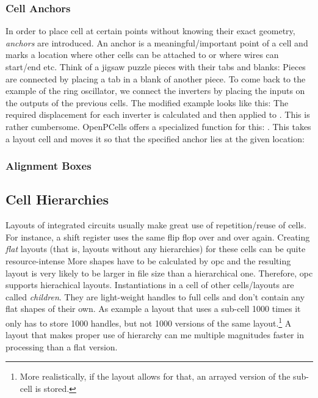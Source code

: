 \subsubsection{Cell Anchors}
In order to place cell at certain points without knowing their exact geometry, \emph{anchors} are introduced.
An anchor is a meaningful/important point of a cell and marks a location where other cells can be attached to or where wires can start/end etc.
Think of a jigsaw puzzle pieces with their tabs and blanks: Pieces are connected by placing a tab in a blank of another piece.
To come back to the example of the ring oscillator, we connect the inverters by placing the inputs on the outputs of the previous cells.
The modified example looks like this:
The required displacement for each inverter is calculated and then applied to .
This is rather cumbersome.
OpenPCells offers a specialized function for this: .
This takes a layout cell and moves it so that the specified anchor lies at the given location:

\subsubsection{Alignment Boxes}

\subsection{Cell Hierarchies}\label{sec:hierarchies}
Layouts of integrated circuits usually make great use of repetition/reuse of cells.
For instance, a shift register uses the same flip flop over and over again.
Creating \emph{flat} layouts (that is, layouts without any hierarchies) for these cells can be quite resource-intense
More shapes have to be calculated by opc and the resulting layout is very likely to be larger in file size than a hierarchical one.
Therefore, opc supports hierachical layouts.
Instantiations in a cell of other cells/layouts are called \emph{children}.
They are light-weight handles to full cells and don't contain any flat shapes of their own.
As example a layout that uses a sub-cell 1000 times it only has to store 1000 handles, but not 1000 versions of the same layout.\footnote{More realistically, if the layout allows for that, an arrayed version of the sub-cell is stored.}
A layout that makes proper use of hierarchy can me multiple magnitudes faster in processing than a flat version.

